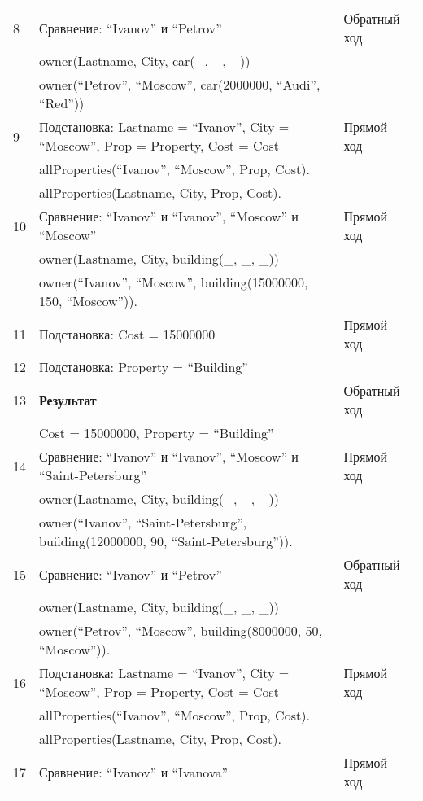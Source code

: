 {\begin{longtable}{|p{1.15cm}|p{8cm}|p{8cm}|}
    \hline
    8 & Сравнение: ``Ivanov'' и ``Petrov'' & Обратный ход \\
      & owner(Lastname, City, car(\_, \_, \_)) & \\
      & owner(``Petrov'', ``Moscow'', car(2000000, ``Audi'', ``Red'')) & \\
    \hline
    9 & Подстановка: Lastname = ``Ivanov'', City = ``Moscow'', Prop = Property, Cost = Cost & Прямой ход \\
      & allProperties(``Ivanov'', ``Moscow'', Prop, Cost). & \\
      & allProperties(Lastname, City, Prop, Cost). & \\
    \hline
    10 & Сравнение: ``Ivanov'' и ``Ivanov'', ``Moscow'' и ``Moscow'' & Прямой ход \\
       & owner(Lastname, City, building(\_, \_, \_)) & \\
       & owner(``Ivanov'', ``Moscow'', building(15000000, 150, ``Moscow'')). & \\
    \hline
    11 & Подстановка: Cost = 15000000 & Прямой ход \\
    \hline
    12 & Подстановка: Property = ``Building'' & \\
    \hline
    13 & \textbf{Результат} & Обратный ход \\
       & Cost = 15000000, Property = ``Building'' & \\
    \hline
    14 & Сравнение: ``Ivanov'' и ``Ivanov'', ``Moscow'' и ``Saint-Petersburg'' & Прямой ход \\
       & owner(Lastname, City, building(\_, \_, \_)) & \\
       & owner(``Ivanov'', ``Saint-Petersburg'', building(12000000, 90, ``Saint-Petersburg'')). & \\
    \hline
    15 & Сравнение: ``Ivanov'' и ``Petrov'' & Обратный ход \\
       & owner(Lastname, City, building(\_, \_, \_)) & \\
       & owner(``Petrov'', ``Moscow'', building(8000000, 50, ``Moscow'')). & \\
    \hline
    16 & Подстановка: Lastname = ``Ivanov'', City = ``Moscow'', Prop = Property, Cost = Cost & Прямой ход \\
      & allProperties(``Ivanov'', ``Moscow'', Prop, Cost). & \\
      & allProperties(Lastname, City, Prop, Cost). & \\
    \hline
    17 & Сравнение: ``Ivanov'' и ``Ivanova'' & Прямой ход \\

\end{longtable}}
